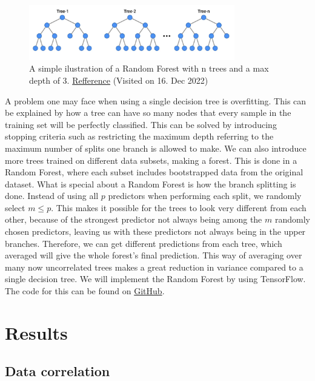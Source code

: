 \documentclass[11pt]{article}
\begin{document}
\begin{figure}[H]
    \centering
    \includegraphics[width=0.8\textwidth]{../figures/Decision_tree.png}
    \caption{A simple ilustration of a Random Forest with n trees and a max depth of 3. \href{https://towardsdatascience.com/how-do-random-forests-decision-trees-decide-simply-explained-with-an-example-in-python-6737eb183604}{Refference} (Visited on 16. Dec 2022) }
    \label{fig:tree}
\end{figure}
A problem one may face when using a single decision tree is overfitting. This can be explained by how a tree can have so many nodes that every sample in the training set will be perfectly classified. This can be solved by introducing stopping criteria such as restricting the maximum depth referring to the maximum number of splits one branch is allowed to make. We can also introduce more trees trained on different data subsets, making a forest. This is done in a Random Forest, where each subset includes bootstrapped data from the original dataset. What is special about a Random Forest is how the branch splitting is done. Instead of using all $p$ predictors when performing each split, we randomly select $m \leq p$. This makes it possible for the trees to look very different from each other, because of the strongest predictor not always being among the $m$ randomly chosen predictors, leaving us with these predictors not always being in the upper branches. Therefore, we can get different predictions from each tree, which averaged will give the whole forest's final prediction. This way of averaging over many now uncorrelated trees makes a great reduction in variance compared to a single decision tree. We will implement the Random Forest by using TensorFlow. The code for this can be found on \href{https://github.com/Fslippe/FYS-STK4155/tree/main/project3}{GitHub}.



\section{Results}
\label{sec:Results}

\subsection{Data correlation} %
\end{document}
